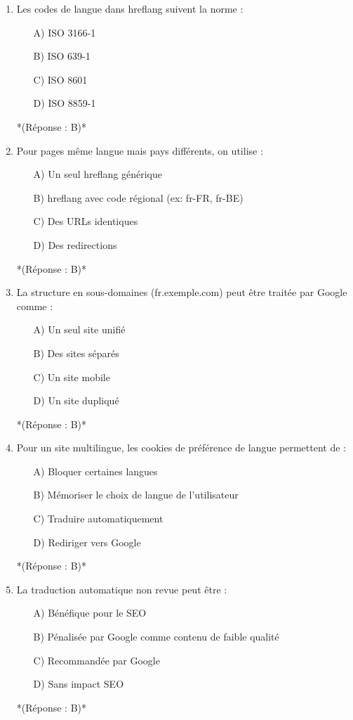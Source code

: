 \documentclass[12pt,a4paper,twoside]{report}
\begin{document}
\begin{enumerate}
\item Les codes de langue dans hreflang suivent la norme :
\begin{itemize}
\item[A)] ISO 3166-1
\item[B)] ISO 639-1
\item[C)] ISO 8601
\item[D)] ISO 8859-1
\end{itemize}
*(Réponse : B)*

\item Pour pages même langue mais pays différents, on utilise :
\begin{itemize}
\item[A)] Un seul hreflang générique
\item[B)] hreflang avec code régional (ex: fr-FR, fr-BE)
\item[C)] Des URLs identiques
\item[D)] Des redirections
\end{itemize}
*(Réponse : B)*

\item La structure en sous-domaines (fr.exemple.com) peut être traitée par Google comme :
\begin{itemize}
\item[A)] Un seul site unifié
\item[B)] Des sites séparés
\item[C)] Un site mobile
\item[D)] Un site dupliqué
\end{itemize}
*(Réponse : B)*

\item Pour un site multilingue, les cookies de préférence de langue permettent de :
\begin{itemize}
\item[A)] Bloquer certaines langues
\item[B)] Mémoriser le choix de langue de l'utilisateur
\item[C)] Traduire automatiquement
\item[D)] Rediriger vers Google
\end{itemize}
*(Réponse : B)*

\item La traduction automatique non revue peut être :
\begin{itemize}
\item[A)] Bénéfique pour le SEO
\item[B)] Pénalisée par Google comme contenu de faible qualité
\item[C)] Recommandée par Google
\item[D)] Sans impact SEO
\end{itemize}
*(Réponse : B)*


\end{enumerate}
\end{document}
